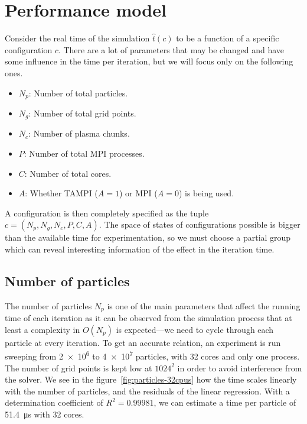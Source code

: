 %
\vspace{1em}

\section{Performance model}

Consider the real time of the simulation $\hat t(c)$ to be a function of a 
specific configuration $c$. There are a lot of parameters that may be changed 
and have some influence in the time per iteration, but we will focus only on the 
following ones.
%
\begin{itemize}
\item $N_p$: Number of total particles.
\item $N_g$: Number of total grid points.
\item $N_c$: Number of plasma chunks.
\item $P$: Number of total MPI processes.
\item $C$: Number of total cores.
\item $A$: Whether TAMPI ($A = 1$) or MPI ($A=0$) is being used.
\end{itemize}
%
A configuration is then completely specified as the tuple $c = (N_p, N_g, N_c, 
P, C, A)$. The space of states of configurations possible is bigger than the 
available time for experimentation, so we must choose a partial group which can 
reveal interesting information of the effect in the iteration time.
%
\subsection{Number of particles}

The number of particles $N_p$ is one of the main parameters that affect the
running time of each iteration as it can be observed from the simulation process 
that at least a complexity in $O(N_p)$ is expected---we need to cycle through 
each particle at every iteration. To get an accurate relation, an experiment is 
run sweeping from \num{2e6} to \num{4e7} particles, with 32 cores and only one 
process. The number of grid points is kept low at $1024^2$ in order to avoid 
interference from the solver. We see in the figure~\ref{fig:particles-32cpus} 
how the time scales linearly with the number of particles, and the residuals of 
the linear regression. With a determination coefficient of $R^2 = 0.99981$, we 
can estimate a time per particle of \SI{51.4}{\micro\second} with 32 cores.

